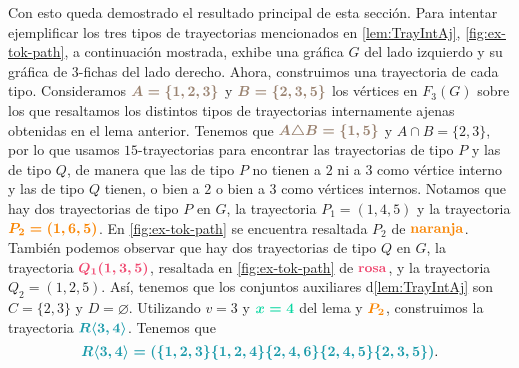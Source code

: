 Con esto queda demostrado el resultado principal de esta secci\'on. Para
intentar ejemplificar los tres tipos de trayectorias mencionados en
\cref{lem:TrayIntAj}, \cref{fig:ex-tok-path}, a continuaci\'on mostrada, exhibe
una gr\'afica $G$ del lado izquierdo y su gr\'afica de $3$-fichas del lado
derecho. Ahora, construimos una trayectoria de cada tipo. Consideramos
${\color{baige}\boldsymbol {A= \{1,2,3\}}}$ y ${\color{baige}\boldsymbol
{B=\{2,3,5\}}}$ los v\'ertices en $F_3(G)$ sobre los que resaltamos los
distintos tipos de trayectorias internamente ajenas obtenidas en el lema
anterior. Tenemos que ${\color{baige} \boldsymbol {A\triangle B=\{1,5\}}}$ y
$A\cap B=\{2,3\}$, por lo que usamos $15$-trayectorias para encontrar las
trayectorias de tipo $P$ y las de tipo $Q$, de manera que las de tipo $P$ no
tienen a $2$ ni a $3$ como v\'ertice interno y las de tipo $Q$ tienen, o bien a
$2$ o bien a $3$ como v\'ertices internos. Notamos que hay dos trayectorias de
tipo $P$ en $G$, la trayectoria $P_1=(1,4,5)$ y la trayectoria
${\color{naranja}\boldsymbol {P_2=(1,6,5)}}$. En \cref{fig:ex-tok-path} se
encuentra resaltada $P_2$ de ${\color{naranja} \bf naranja}$. Tambi\'en podemos
observar que hay dos trayectorias de tipo $Q$ en $G$, la trayectoria
${\color{fushia}\boldsymbol {Q_1(1,3,5)}}$, resaltada en \cref{fig:ex-tok-path}
de ${\color{fushia}\bf rosa}$, y la trayectoria $Q_2=(1,2,5)$. As\'i, tenemos
que los conjuntos auxiliares d\cref{lem:TrayIntAj} son $C=\{2,3\}$ y $D=
\varnothing$. Utilizando $v=3$ y ${\color{menta}\boldsymbol {x=4}}$ del lema y
${\color{naranja}\boldsymbol {P_2}}$, construimos la trayectoria $
{\color{verdeAzulado}\boldsymbol {R\langle 3, 4 \rangle}}$. Tenemos que 
\[
    {\color{verdeAzulado}\boldsymbol {R\langle 3, 4 \rangle =(\{1,2,3\}\{1,2,4\}
    \{2,4,6\}\{2,4,5\}\{2,3,5\})}}.
\]

